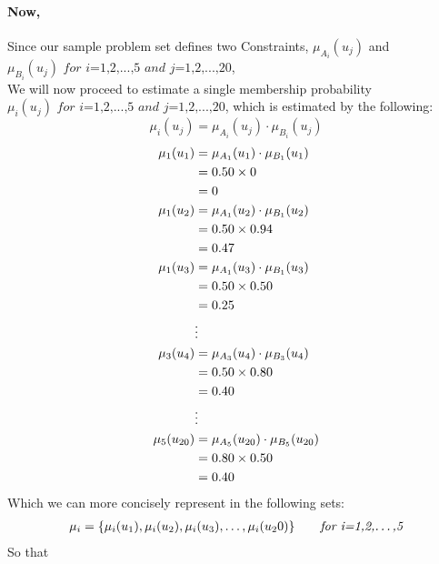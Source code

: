 \documentclass[a4paper]{book}
\begin{document}
			\paragraph{Now,}
				Since our sample problem set defines two Constraints, $\mu_{A_i}(u_j)$ and $\mu_{B_i}(u_j) \textit{ for i=1,2,...,5 and j=1,2,...,20}$, \\
				We will now proceed to estimate a single membership probability $\mu_i(u_j)  \textit{ for i=1,2,...,5 and j=1,2,...,20}$, which is estimated by the following:
				\begin{equation}
					\mu_i(u_j) = \mu_{A_i}(u_j) \cdot \mu_{B_i}(u_j)
				\end{equation}
				\begin{align}
					\mu_1(u_1) &= \mu_{A_1}(u_1) \cdot \mu_{B_1}(u_1) \\
					&= 0.50 \times 0 \notag \\
					&= 0 \notag\\
					\mu_1(u_2) &= \mu_{A_1}(u_2) \cdot \mu_{B_1}(u_2) \\
					&= 0.50 \times 0.94 \notag \\
					&= 0.47 \notag\\
					\mu_1(u_3) &= \mu_{A_1}(u_3) \cdot \mu_{B_1}(u_3) \\
					&= 0.50 \times 0.50 \notag \\
					&= 0.25 \notag\\
					&\vdots \notag \\
					\mu_3(u_4) &= \mu_{A_3}(u_4) \cdot \mu_{B_3}(u_4) \\
					&= 0.50 \times 0.80 \notag \\
					&= 0.40 \notag\\
					&\vdots \notag \\
					\mu_5(u_{20}) &= \mu_{A_5}(u_{20}) \cdot \mu_{B_5}(u_{20}) \\
					&= 0.80 \times 0.50 \notag \\
					&= 0.40 \notag\\
				\end{align}
				Which we can more concisely represent in the following sets:
				\begin{align}
					\mu_i = \{ \mu_i(u_1), \mu_i(u_2), \mu_i(u_3),\dots,\mu_i(u_20) \} \qquad \textit{for i=1,2,\dots,5}
				\end{align}
				So that
\end{document}
